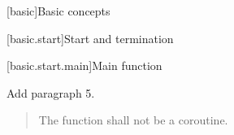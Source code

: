 
\setcounter{chapter}{2}
[basic]{Basic concepts}

\setcounter{section}{5}
[basic.start]{Start and termination}

[basic.start.main]{Main function}

Add paragraph 5.

\begin{quote}
	\setcounter{Paras}{4}
	\pnum
	The function  shall not be a coroutine.
\end{quote}
